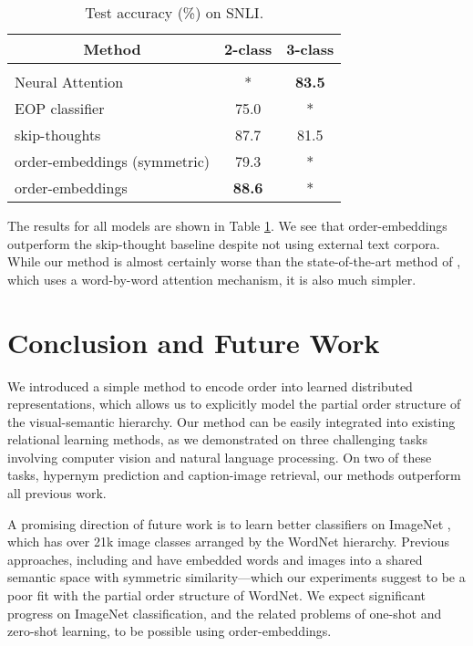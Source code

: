 \documentclass{article} \usepackage{iclr2016_conference,times}
\begin{document}
\begin{table}[t]
	\begin{center}
		\begin{tabular}{lcc}
		
			\multicolumn{1}{c}{\bf Method}  &\multicolumn{1}{c}{\bf 2-class} &\multicolumn{1}{c}{\bf 3-class}
			\\ \hline \\
			Neural Attention \citep{rocktaschel2015reasoning} & * & \textbf{83.5}\\
			EOP classifier \citep{snli} & 75.0 & * \\
			skip-thoughts  & 87.7 & 81.5\\
			order-embeddings (symmetric) & 79.3 & *\\
			order-embeddings  & \textbf{88.6} & *\\
		\end{tabular}
	\end{center}
	\caption{Test accuracy (\%) on SNLI. }
		\label{table:snli}
	\vspace{-2mm}
\end{table}

The results for all models are shown in Table \ref{table:snli}. We see that order-embeddings outperform the skip-thought baseline despite not using external text corpora. While our method is almost certainly worse than the state-of-the-art method of \citet{rocktaschel2015reasoning}, which uses a word-by-word attention mechanism, it is also much simpler. 
\vspace{-1mm}
\section{Conclusion and Future Work}
\vspace{-0.5mm}

We introduced a simple method to encode order into learned distributed representations, which allows us to explicitly model the partial order structure of the visual-semantic hierarchy. Our method can be easily integrated into existing relational learning methods, as we demonstrated  on three challenging tasks involving computer vision and natural language processing. On two of these tasks, hypernym prediction and caption-image retrieval, our methods outperform all previous work.

A promising direction of future work is to learn better classifiers on ImageNet \citep{imagenet}, which has over 21k image classes arranged by the WordNet hierarchy.  Previous approaches, including \citet{frome2013devise} and \citet{norouzi2013zero} have embedded words and images into a shared semantic space with symmetric similarity---which our experiments suggest to be a poor fit with the partial order structure of WordNet. We expect significant progress on ImageNet classification, and the related problems of one-shot and zero-shot learning,  to be possible using order-embeddings.
\end{document}
